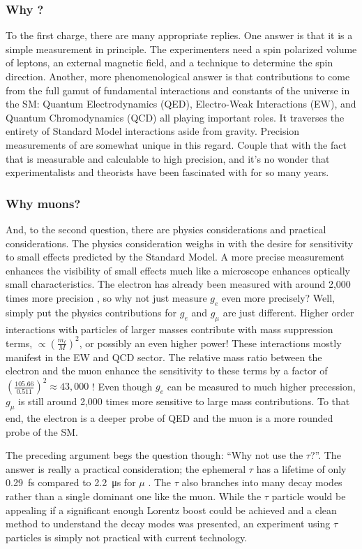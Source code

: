 \subsubsection{Why \gmtwo?}
To the first charge, there are many appropriate replies.  One answer is that it is a simple measurement in principle.  The experimenters need a spin polarized volume of leptons, an external magnetic field, and a technique to determine the spin direction. Another, more phenomenological answer is that contributions to \gmtwo come from the full gamut of fundamental interactions and constants of the universe in the SM: Quantum Electrodynamics (QED), Electro-Weak Interactions (EW), and Quantum Chromodynamics (QCD) all playing important roles. It traverses the entirety of Standard Model interactions aside from gravity. Precision measurements of \gmtwo are somewhat unique in this regard.  Couple that with the fact that \gmtwo is measurable and calculable to high precision, and it's no wonder that experimentalists and theorists have been fascinated with \gmtwo for so many years.

\subsubsection{Why muons?}
And, to the second question, there are physics considerations and practical considerations.  The physics consideration weighs in with the desire for sensitivity to small effects predicted by the Standard Model.  A more precise measurement enhances the visibility of small effects much like a microscope enhances optically small characteristics.  The electron \gmtwo has already been measured with around 2,000 times more precision \cite{g-e-measurement}, so why not just measure $g_e$ even more precisely?  Well, simply put the physics contributions for $g_e$ and $g_\mu$ are just different.  Higher order interactions with particles of larger masses contribute with mass suppression terms, $\propto (\frac{m_\ell}{M})^2$, or possibly an even higher power!  These interactions mostly manifest in the EW and QCD sector.  The relative mass ratio between the electron and the muon enhance the sensitivity to these terms by a factor of $(\frac{105.66}{0.511})^2 \approx 43,000$ \cite{the-muon-g-2}!  Even though $g_e$ can be measured to much higher precession, $g_\mu$ is still around 2,000 times more sensitive to large mass contributions.  To that end, the electron \gmtwo is a deeper probe of QED and the muon \gmtwo is a more rounded probe of the SM.  

The preceding argument begs the question though: ``Why not use the $\tau$?''.  The answer is really a practical consideration; the ephemeral $\tau$ has a lifetime of only \SI{0.29}{\femto\second} compared to \SI{2.2}{\micro\second} for $\mu$ \cite{codata}.  The $\tau$ also branches into many decay modes rather than a single dominant one like the muon.  While the $\tau$ particle would be appealing if a significant enough Lorentz boost could be achieved and a clean method to understand the decay modes was presented, an experiment using $\tau$ particles is simply not practical with current technology.

